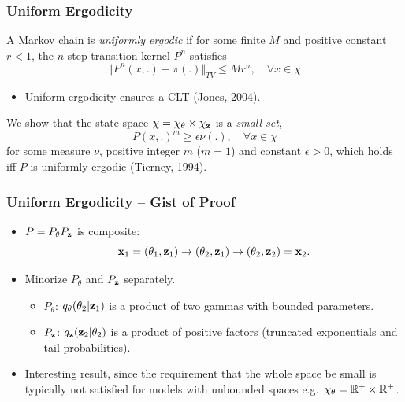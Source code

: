 \documentclass{beamer}
\begin{document}
\begin{frame} \frametitle{Uniform Ergodicity}  
	
	A Markov chain is \textit{uniformly ergodic} if for some finite $M$ and positive constant $r<1$, the $n$-step transition kernel $P^n$ satisfies
	$$
	\Vert P^n(x,.)-\pi(.)\Vert_{TV} \le M r^n, \quad \forall x \in \chi
	$$
	
	\begin{itemize}
		\item Uniform ergodicity ensures a CLT (Jones, 2004).
	\end{itemize}
\vfill
	We show that the state space $\chi = \chi_\theta \times \chi_{\mathbf{z}}$ is a \textit{small set},
	\begin{equation*}
		P(x,.)^m \ge \epsilon \nu(.), \quad \forall x\in \chi
	\end{equation*}
	for some measure $\nu$, positive integer $m$ ($m=1$) and constant $\epsilon > 0$, which holds iff $P$ is uniformly ergodic (Tierney, 1994).
\end{frame}

\begin{frame} \frametitle{Uniform Ergodicity -- Gist of Proof}  


\begin{itemize}
	\item $P = P_{\theta} P_{\mathbf{z}}$ is composite:
	$$\mathbf{x}_1 = (\theta_1, \mathbf{z}_1) \rightarrow (\theta_2, \mathbf{z}_1) \rightarrow (\theta_2, \mathbf{z}_2) = \mathbf{x}_2.$$
	\item Minorize $P_{\theta}$ and $P_{\mathbf{z}}$ separately.
	\begin{itemize}
		\item $P_\theta$: $q_\theta(\theta_2|\mathbf{z}_1)$ is a product of two gammas with bounded parameters.
		\item $P_{\mathbf{z}}$: $q_{\mathbf{z}}(\mathbf{z}_2|\theta_2)$ is a product of positive factors (truncated exponentials and tail probabilities).
	\end{itemize}
	\item Interesting result, since the requirement that the whole space be small is typically not satisfied for models with unbounded spaces e.g.\ $\chi_\theta = \mathbb{R}^+\times\mathbb{R}^+$.
\end{itemize}

\end{frame}
	
	
\end{document}
